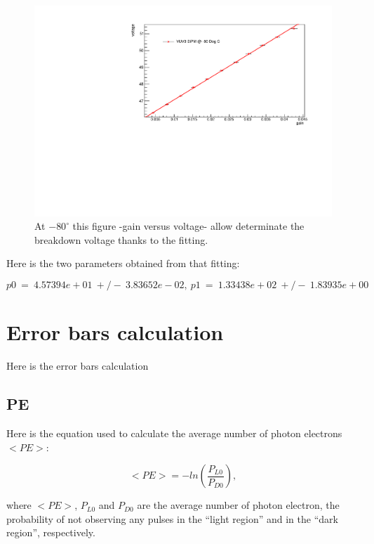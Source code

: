\documentclass[a4paper, 11pt]{report}%
\begin{document}
  \begin{figure}[!hbtp]
    \centering
    \includegraphics[totalheight=0.5\textwidth,trim=.5cm 0cm 1.6cm 0.9cm, clip=true]{../Pictures/BV_VUV3_-80C.pdf} 
    \caption{At $-80^\circ$ this figure -gain versus voltage- allow determinate the breakdown voltage thanks to the fitting.}
    \label{fig:BV_VUV3_SiPM}
  \end{figure}
  
  Here is the two parameters obtained from that fitting:
  
  \begin{equation}
    p0\ =\ 4.57394e+01\ +/-\ 3.83652e-02,\ p1\ =\ 1.33438e+02\ +/-\ 1.83935e+00 
  \end{equation}

  \newpage
  
  \section{Error bars calculation}
  
  Here is the error bars calculation
  
  \subsection{PE}
  
  Here is the equation used to calculate the average number of photon electrons $<PE>$:
  
  \begin{equation}
    <PE> =  -ln(\frac{P_{L0}}{P_{D0}}), 
  \end{equation}
 
  where $<PE>$, $P_{L0}$ and $P_{D0}$ are the average number of photon electron, the probability of not observing any pulses in the 
  ``light region'' and in the ``dark region'', respectively.
  \\
  
\end{document}
